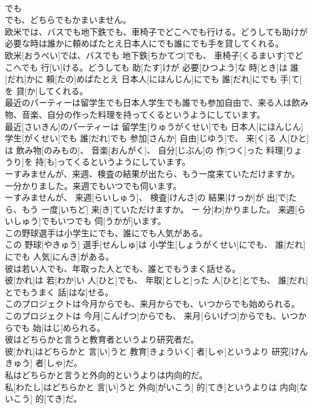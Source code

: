 \documentclass[8pt]{extreport}
\begin{document}
\begin{CJK}{UTF8}{min}
\\	でも 
\\	でも、どちらでもかまいません。
\\	欧米では、バスでも地下鉄でも、車椅子でどこへでも行ける。どうしても助けが必要な時は誰かに頼めばたとえ日本人にでも誰にでも手を貸してくれる。	
\\	欧米[おうべい]では、バスでも 地下鉄[ちかてつ]でも、 車椅子[くるまいす]でどこへでも 行[い]ける。どうしても 助[たす]けが 必要[ひつよう]な 時[とき]は 誰[だれ]かに 頼[たの]めばたとえ 日本人[にほんじん]にでも 誰[だれ]にでも 手[て]を 貸[か]してくれる。
\\	最近のパーティーは留学生でも日本人学生でも誰でも参加自由で、来る人は飲み物、音楽、自分の作った料理を持ってくるというようにしています。	
\\	最近[さいきん]のパーティーは 留学生[りゅうがくせい]でも 日本人[にほんじん] 学生[がくせい]でも 誰[だれ]でも 参加[さんか] 自由[じゆう]で、 来[く]る 人[ひと]は 飲み物[のみもの]、 音楽[おんがく]、 自分[じぶん]の 作[つく]った 料理[りょうり]を 持[も]ってくるというようにしています。
\\	ーすみませんが、来週、検査の結果が出たら、もう一度来ていただけますか。 ー分かりました。来週でもいつでも伺います。	
\\	ーすみませんが、 来週[らいしゅう]、 検査[けんさ]の 結果[けっか]が 出[で]たら、もう 一度[いちど] 来[き]ていただけますか。 ー 分[わ]かりました。 来週[らいしゅう]でもいつでも 伺[うかが]います。
\\	この野球選手は小学生にでも、誰にでも人気がある。	
\\	この 野球[やきゅう] 選手[せんしゅ]は 小学生[しょうがくせい]にでも、 誰[だれ]にでも 人気[にんき]がある。
\\	彼は若い人でも、年取った人とでも、誰とでもうまく話せる。	
\\	彼[かれ]は 若[わか]い 人[ひと]でも、 年取[としと]った 人[ひと]とでも、 誰[だれ]とでもうまく 話[はな]せる。
\\	このプロジェクトは今月からでも、来月からでも、いつからでも始められる。	
\\	このプロジェクトは 今月[こんげつ]からでも、 来月[らいげつ]からでも、いつからでも 始[はじ]められる。
\\	彼はどちらかと言うと教育者というより研究者だ。	
\\	彼[かれ]はどちらかと 言[い]うと 教育[きょういく] 者[しゃ]というより 研究[けんきゅう] 者[しゃ]だ。
\\	私はどちらかと言うと外向的というよりは内向的だ。	
\\	私[わたし]はどちらかと 言[い]うと 外向[がいこう] 的[てき]というよりは 内向[ないこう] 的[てき]だ。

\end{CJK}
\end{document}
